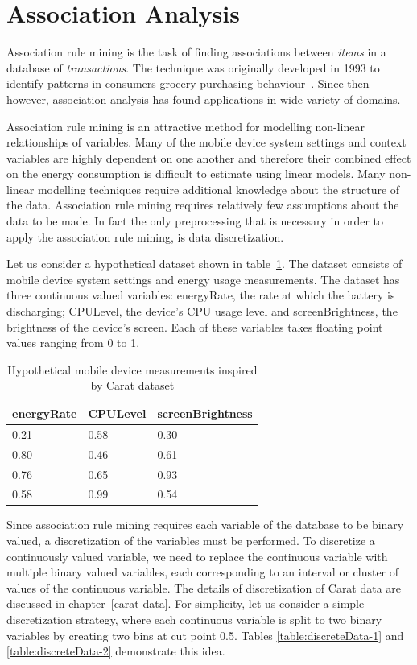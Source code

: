 \section{Association Analysis} \label{association analysis}

Association rule mining is the task of finding associations between \textit{items} in a database of \textit{transactions}. The technique was originally developed in 1993 to identify patterns in consumers grocery purchasing behaviour~\cite{Agrawal:1993:MAR:170036.170072}. Since then however, association analysis has found applications in wide variety of domains.

Association rule mining is an attractive method for modelling non-linear relationships of variables. Many of the mobile device system settings and context variables are highly dependent on one another and therefore their combined effect on the energy consumption is difficult to estimate using linear models. Many non-linear modelling techniques require additional knowledge about the structure of the data. Association rule mining requires relatively few assumptions about the data to be made. In fact the only preprocessing that is necessary in order to apply the association rule mining, is data discretization.    

Let us consider a hypothetical dataset shown in table~\ref{table:raw-data}. The dataset consists of mobile device system settings and energy usage measurements. The dataset has three continuous valued variables:  energyRate, the rate at which the battery is discharging;  CPULevel, the device's CPU usage level and screenBrightness, the brightness of the device's screen. Each of these variables takes floating point values ranging from 0 to 1.
\begin{table} %
    \begin{tabular}{ | l | l | l | }
    \hline
    \textbf{energyRate} & \textbf{CPULevel} & \textbf{screenBrightness} \\ \hline
    0.21 & 0.58 & 0.30 \\ \hline 
    0.80 & 0.46 & 0.61 \\ \hline 
    0.76 & 0.65 & 0.93 \\ \hline 
    0.58 & 0.99 & 0.54 \\ \hline 
    \end{tabular}
	\caption{Hypothetical mobile device measurements inspired by Carat dataset}
	\label{table:raw-data}
\end{table}

Since association rule mining requires each variable of the database to be binary valued, a discretization of the variables must be performed. To discretize a continuously valued variable, we need to replace the continuous variable with multiple binary valued variables, each corresponding to an interval or cluster of values of the continuous variable. The details of discretization of Carat data are discussed in chapter~\ref{carat data}. For simplicity, let us consider a simple discretization strategy, where each continuous variable is split to two binary variables by creating two bins at cut point 0.5. Tables \ref{table:discreteData-1} and \ref{table:discreteData-2} demonstrate this idea.

